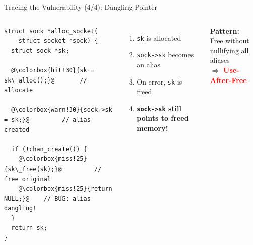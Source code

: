 \documentclass[aspectratio=169,10pt]{beamer}
\begin{document}
\begin{frame}[fragile]{Tracing the Vulnerability (4/4): Dangling Pointer}
  \begin{columns}
    \begin{tcolorbox}[colback=c1!3, colframe=c1!40!black, boxrule=0.5pt,
      left=4pt, right=4pt, top=4pt, bottom=4pt, arc=3pt,
      shadow={0.5mm}{-0.5mm}{0mm}{black!15}]
    \begin{lstlisting}[style=ccode, basicstyle=\ttfamily\scriptsize\color{black!80},
      keywordstyle=\color{c4}\bfseries, commentstyle=\color{c1!70!black}\itshape,
      stringstyle=\color{c6}, escapechar=@]
struct sock *alloc_socket(
    struct socket *sock) {
  struct sock *sk;

  @\colorbox{hit!30}{sk = sk\_alloc();}@       // allocate

  @\colorbox{warn!30}{sock->sk = sk;}@         // alias created

  if (!chan_create()) {
    @\colorbox{miss!25}{sk\_free(sk);}@         // free original
    @\colorbox{miss!25}{return NULL;}@    // BUG: alias dangling!
  }
  return sk;
}
    \end{lstlisting}
    \end{tcolorbox}

    \begin{enumerate}
      \item[\faCheckCircle] \texttt{sk} is allocated
      \item[\faCheckCircle] \texttt{sock->sk} becomes an alias
      \item[\faCheckCircle] On error, \texttt{sk} is freed
      \item[\textcolor{red}{\faBug}] \textbf{\texttt{sock->sk} still points to freed memory!}
    \end{enumerate}

    \vspace{0.5cm}
    \textbf{Pattern:}\\
    Free without nullifying all aliases\\
    $\Rightarrow$ \textcolor{red}{\textbf{Use-After-Free}}

    \vspace{0.3cm}
    
  \end{columns}
\end{frame}
\end{document}
